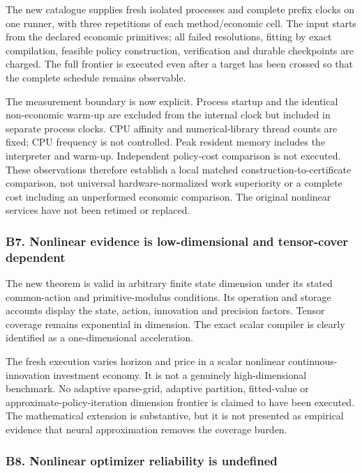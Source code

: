 \documentclass[ecta,nameyear,draft]{econsocart}
\begin{document}
The new catalogue supplies fresh isolated processes and complete prefix
clocks on one runner, with three repetitions of each method/economic
cell. The input starts from the declared economic primitives; all failed
resolutions, fitting by exact compilation, feasible policy construction,
verification and durable checkpoints are charged. The full frontier is
executed even after a target has been crossed so that the complete
schedule remains observable.

The measurement boundary is now explicit. Process startup and the
identical non-economic warm-up are excluded from the internal clock but
included in separate process clocks. CPU affinity and numerical-library
thread counts are fixed; CPU frequency is not controlled. Peak resident
memory includes the interpreter and warm-up. Independent policy-cost
comparison is not executed. These observations therefore establish a
local matched construction-to-certificate comparison, not universal
hardware-normalized work superiority or a complete cost including an
unperformed economic comparison. The original nonlinear services have
not been retimed or replaced.

\hypertarget{b7-nonlinear-evidence-is-low-dimensional-and-tensor-cover-dependent}{%
\subsubsection{B7. Nonlinear evidence is low-dimensional and
tensor-cover
dependent}\label{b7-nonlinear-evidence-is-low-dimensional-and-tensor-cover-dependent}}

The new theorem is valid in arbitrary finite state dimension under its
stated common-action and primitive-modulus conditions. Its operation and
storage accounts display the state, action, innovation and precision
factors. Tensor coverage remains exponential in dimension. The exact
scalar compiler is clearly identified as a one-dimensional acceleration.

The fresh execution varies horizon and price in a scalar nonlinear
continuous-innovation investment economy. It is not a genuinely
high-dimensional benchmark. No adaptive sparse-grid, adaptive partition,
fitted-value or approximate-policy-iteration dimension frontier is
claimed to have been executed. The mathematical extension is
substantive, but it is not presented as empirical evidence that neural
approximation removes the coverage burden.

\hypertarget{b8-nonlinear-optimizer-reliability-is-undefined}{%
\subsubsection{B8. Nonlinear optimizer reliability is
undefined}\label{b8-nonlinear-optimizer-reliability-is-undefined}}
\end{document}
